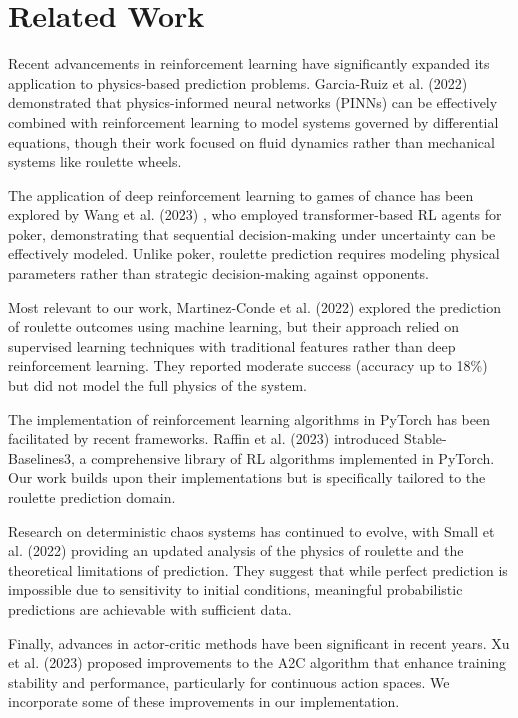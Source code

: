 \documentclass[conference]{IEEEtran}
\begin{document}
\section{Related Work}

Recent advancements in reinforcement learning have significantly expanded its application to physics-based prediction problems. Garcia-Ruiz et al. (2022) \cite{garcia2022physics} demonstrated that physics-informed neural networks (PINNs) can be effectively combined with reinforcement learning to model systems governed by differential equations, though their work focused on fluid dynamics rather than mechanical systems like roulette wheels.

The application of deep reinforcement learning to games of chance has been explored by Wang et al. (2023) \cite{wang2023reinforcement}, who employed transformer-based RL agents for poker, demonstrating that sequential decision-making under uncertainty can be effectively modeled. Unlike poker, roulette prediction requires modeling physical parameters rather than strategic decision-making against opponents.

Most relevant to our work, Martinez-Conde et al. (2022) \cite{martinez2022prediction} explored the prediction of roulette outcomes using machine learning, but their approach relied on supervised learning techniques with traditional features rather than deep reinforcement learning. They reported moderate success (accuracy up to 18\%) but did not model the full physics of the system.

The implementation of reinforcement learning algorithms in PyTorch has been facilitated by recent frameworks. Raffin et al. (2023) \cite{raffin2023stable} introduced Stable-Baselines3, a comprehensive library of RL algorithms implemented in PyTorch. Our work builds upon their implementations but is specifically tailored to the roulette prediction domain.

Research on deterministic chaos systems has continued to evolve, with Small et al. (2022) \cite{small2022chaos} providing an updated analysis of the physics of roulette and the theoretical limitations of prediction. They suggest that while perfect prediction is impossible due to sensitivity to initial conditions, meaningful probabilistic predictions are achievable with sufficient data.

Finally, advances in actor-critic methods have been significant in recent years. Xu et al. (2023) \cite{xu2023actor} proposed improvements to the A2C algorithm that enhance training stability and performance, particularly for continuous action spaces. We incorporate some of these improvements in our implementation.
\end{document}
